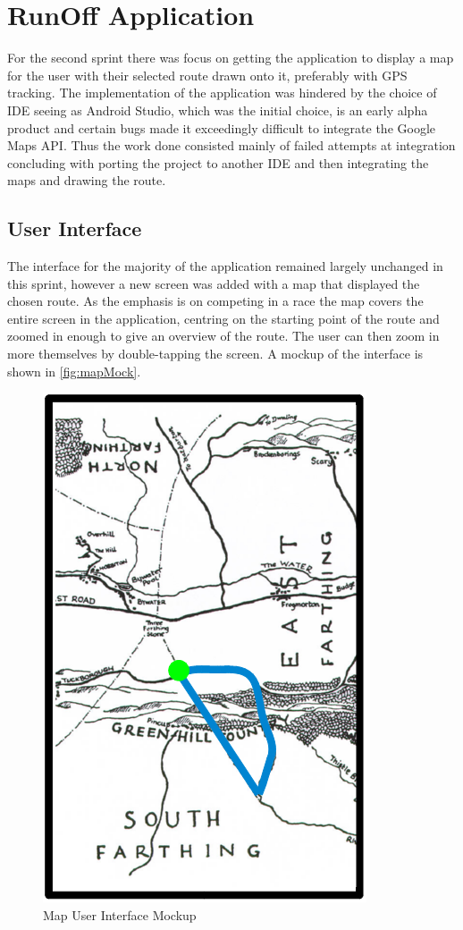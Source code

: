 \section{RunOff Application}
\label{sec:sprint2-app}
For the second sprint there was focus on getting the application to display a map for the user with their selected route drawn onto it, preferably with \ac{GPS} tracking. The implementation of the application was hindered by the choice of \ac{IDE} seeing as Android Studio, which was the initial choice, is an early alpha product and certain bugs made it exceedingly difficult to integrate the Google Maps \ac{API}. Thus the work done consisted mainly of failed attempts at integration concluding with porting the project to another \ac{IDE} and then integrating the maps and drawing the route.

\subsection{User Interface}
The interface for the majority of the application remained largely unchanged in this sprint, however a new screen was added with a map that displayed the chosen route. As the emphasis is on competing in a race the map covers the entire screen in the application, centring on the starting point of the route and zoomed in enough to give an overview of the route. The user can then zoom in more themselves by double-tapping the screen. A mockup of the interface is shown in \autoref{fig:mapMock}.

\begin{figure}[!ht]
	\begin{center}
		\includegraphics[scale=0.4]{img/mapMock.png}
		\caption{Map User Interface Mockup}
		\label{fig:mapMock}
	\end{center}
\end{figure}

